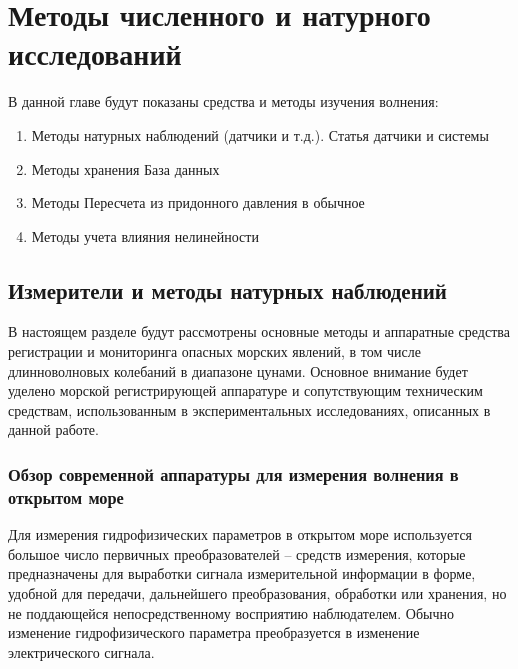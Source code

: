 \chapter{Методы численного и натурного исследований} \label{chapt1}

В данной главе будут показаны средства и методы изучения волнения:
\begin{enumerate}
  \item Методы натурных наблюдений (датчики и т.д.). Статья датчики и системы
  \item Методы хранения База данных
  \item Методы Пересчета из придонного давления в обычное
  \item Методы учета влияния нелинейности
\end{enumerate}

\section{Измерители и методы натурных наблюдений}
В настоящем разделе будут рассмотрены основные методы и аппаратные средства регистрации и мониторинга опасных морских явлений, в том числе длинноволновых колебаний в диапазоне цунами. Основное внимание будет уделено морской регистрирующей аппаратуре и сопутствующим техническим средствам, использованным в экспериментальных исследованиях, описанных в данной работе.
\subsection{Обзор современной аппаратуры для измерения волнения в открытом море}
Для измерения гидрофизических параметров в открытом море используется большое число первичных преобразователей – средств измерения, которые предназначены для выработки сигнала измерительной информации в форме, удобной для передачи, дальнейшего преобразования, обработки или хранения, но не поддающейся непосредственному восприятию наблюдателем. Обычно изменение гидрофизического параметра преобразуется в изменение электрического сигнала.

